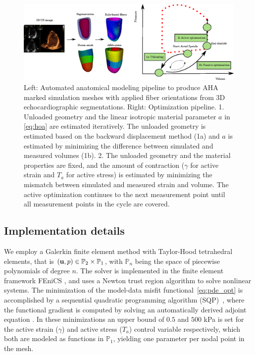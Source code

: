 \begin{figure}[htbp]
\centering
    \includegraphics[width=\textwidth]{models}
\caption{Left: Automated anatomical modeling pipeline to produce AHA
  marked simulation meshes with applied fiber orientations from 3D
  echocardiographic segmentations. Right: Optimization
  pipeline. 1. Unloaded geometry and the linear isotropic
  material parameter $a$ in \eqref{eq:hoa} are estimated iteratively. The unloaded geometry is
  estimated based on the backward displacement method (1a)
  \cite{nikou2016effects} and $a$ is estimated by minimizing the
  difference between simulated and measured volumes (1b). 2. The unloaded
  geometry and the material properties are fixed, and the amount of
  contraction ($\gamma$ for active strain and $T_a$ for active stress)
  is estimated by minimizing the mismatch between simulated and
  measured strain and volume. The active optimization continues to the
  next measurement point until all measurement points in the cycle are covered.}
\label{fig:pipeline}
\end{figure}

\subsection{Implementation details}
We employ a Galerkin finite element method with Taylor-Hood
tetrahedral elements, that is $(\mathbf{u}, p) \in \mathbb{P}_2 \times
\mathbb{P}_1 $, with $\mathbb{P}_n$ being the space of piecewise
polynomials of degree $n$.
The solver is implemented in the finite element framework FEniCS
\cite{logg2012automated}, and uses a Newton trust region algorithm
\cite{PETScPackage} to solve nonlinear systems. The minimization of the
model-data misfit functional~\eqref{eq:pde_opt} is accomplished by a sequential
quadratic programming algorithm (SQP)~\cite{kraft1988software}, where
the functional gradient is computed by solving an automatically derived adjoint
equation \cite{farrell2013automated}. In these minimizations an upper
bound of $0.5$ and $500$ kPa is set for the active strain ($\gamma$)
and active stress ($T_a$) control variable respectively, which both
are modeled as functions in $\mathbb{P}_1$, yielding one parameter per
nodal point in the mesh.

